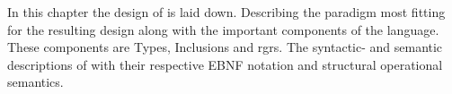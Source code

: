 In this chapter the design of \langname{} is laid down. Describing the paradigm most fitting for the resulting design along with the important components of the language. These components are Types, Inclusions and \ac{rgrs}. The syntactic- and semantic descriptions of \langname{} with their respective EBNF notation and structural operational semantics.